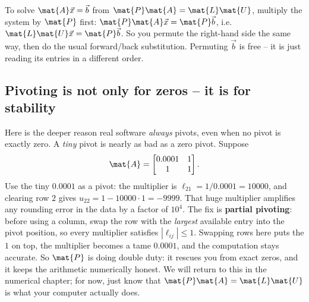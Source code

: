 To solve $\mat{A}\vec{x}=\vec{b}$ from $\mat{P}\mat{A}=\mat{L}\mat{U}$, multiply the system
by $\mat{P}$ first: $\mat{P}\mat{A}\vec{x}=\mat{P}\vec{b}$, i.e.
$\mat{L}\mat{U}\vec{x}=\mat{P}\vec{b}$. So you permute the right-hand side the same way, then
do the usual forward/back substitution. Permuting $\vec{b}$ is free -- it is just reading its
entries in a different order.

\subsection{Pivoting is not only for zeros -- it is for stability}
\label{ch09:pivot-stability}

Here is the deeper reason real software \emph{always} pivots, even when no pivot is exactly
zero. A \emph{tiny} pivot is nearly as bad as a zero pivot. Suppose
\[
  \mat{A} = \begin{bmatrix} 0.0001 & 1 \\ 1 & 1 \end{bmatrix}.
\]
Use the tiny $0.0001$ as a pivot: the multiplier is $\ell_{21}=1/0.0001 = 10000$, and
clearing row $2$ gives $u_{22} = 1 - 10000\cdot 1 = -9999$. That huge multiplier amplifies
any rounding error in the data by a factor of $10^4$. The fix is \textbf{partial pivoting}:
before using a column, swap the row with the \emph{largest} available entry into the pivot
position, so every multiplier satisfies $|\ell_{ij}|\le 1$. Swapping rows here puts the $1$
on top, the multiplier becomes a tame $0.0001$, and the computation stays accurate. So
$\mat{P}$ is doing double duty: it rescues you from exact zeros, and it keeps the arithmetic
numerically honest. We will return to this in the numerical chapter; for now, just know that
$\mat{P}\mat{A}=\mat{L}\mat{U}$ is what your computer actually does.

